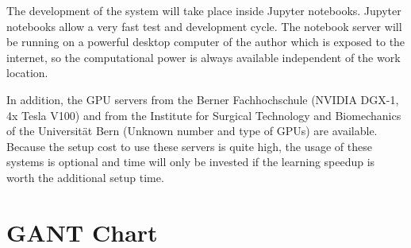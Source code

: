 The development of the system will take place inside Jupyter notebooks. Jupyter notebooks allow a very fast test and development cycle. The notebook server will be running on a powerful desktop computer of the author which is exposed to the internet, so the computational power is always available independent of the work location.

In addition, the GPU servers from the Berner Fachhochschule (NVIDIA DGX-1, 4x Tesla V100) and from the Institute for Surgical Technology and Biomechanics of the Universität Bern (Unknown number and type of GPUs) are available. Because the setup cost to use these servers is quite high, the usage of these systems is optional and time will only be invested if the learning speedup is worth the additional setup time.

\section{GANT Chart}
